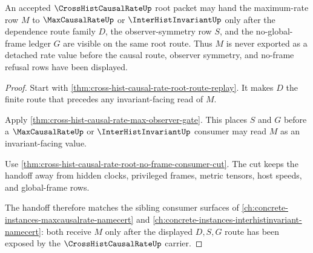 \begin{theorem}
\label{thm:cross-hist-causal-rate-root-max-invariant-handoff}
An accepted $\CrossHistCausalRateUp$ root packet may hand the maximum-rate row $M$ to $\MaxCausalRateUp$ or $\InterHistInvariantUp$ only after the dependence route family $D$, the observer-symmetry row $S$, and the no-global-frame ledger $G$ are visible on the same root route. Thus $M$ is never exported as a detached rate value before the causal route, observer symmetry, and no-frame refusal rows have been displayed.
\end{theorem}
\begin{proof}
Start with \autoref{thm:cross-hist-causal-rate-root-route-replay}. It makes $D$ the finite route that precedes any invariant-facing read of $M$.

Apply \autoref{thm:cross-hist-causal-rate-max-observer-gate}. This places $S$ and $G$ before a $\MaxCausalRateUp$ or $\InterHistInvariantUp$ consumer may read $M$ as an invariant-facing value.

Use \autoref{thm:cross-hist-causal-rate-root-no-frame-consumer-cut}. The cut keeps the handoff away from hidden clocks, privileged frames, metric tensors, host speeds, and global-frame rows.

The handoff therefore matches the sibling consumer surfaces of \autoref{ch:concrete-instances-maxcausalrate-namecert} and \autoref{ch:concrete-instances-interhistinvariant-namecert}: both receive $M$ only after the displayed $D,S,G$ route has been exposed by the $\CrossHistCausalRateUp$ carrier.
\end{proof}

